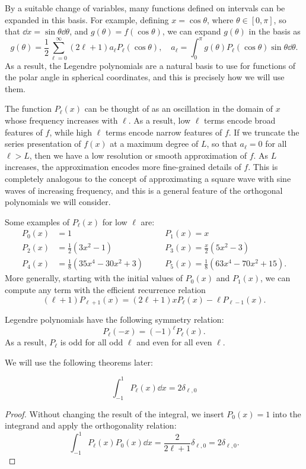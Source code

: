 \documentclass[../../main.tex]{subfiles}
\begin{document}
\begin{refsection}
	By a suitable change of variables, many functions defined on intervals can be expanded in this basis.
	For example, defining $x = \cos\theta$, where $\theta \in [0, \pi]$, so that $\dd{x} = \sin\theta \dd\theta$, and $g(\theta) = f(\cos\theta)$, we can expand $g(\theta)$ in the basis as
	$$g(\theta) = \frac{1}{2} \sum_{\ell=0}^\infty (2\ell+1) a_\ell P_\ell(\cos\theta), \quad a_\ell = \int_0^\pi g(\theta) P_\ell(\cos\theta) \sin\theta \dd{\theta}.$$
	As a result, the Legendre polynomials are a natural basis to use for functions of the polar angle in spherical coordinates, and this is precisely how we will use them.

	The function $P_\ell(x)$ can be thought of as an oscillation in the domain of $x$ whose frequency increases with $\ell$.
	As a result, low $\ell$ terms encode broad features of $f$, while high $\ell$ terms encode narrow features of $f$.
	If we truncate the series presentation of $f(x)$ at a maximum degree of $L$, so that $a_\ell = 0$ for all $\ell > L$, then we have a low resolution or smooth approximation of $f$.
	As $L$ increases, the approximation encodes more fine-grained details of $f$.
	This is completely analogous to the concept of approximating a square wave with sine waves of increasing frequency, and this is a general feature of the orthogonal polynomials we will consider.

	Some examples of $P_\ell(x)$ for low $\ell$ are:
	\begin{align*}
		P_0(x) & = 1 \quad                              &  & P_1(x) = x                                \\
		P_2(x) & = \frac{1}{2}(3x^2 - 1) \quad          &  & P_3(x) = \frac{x}{2}(5x^2 - 3)            \\
		P_4(x) & = \frac{1}{8}(35x^4 - 30x^2 + 3) \quad &  & P_5(x) = \frac{1}{8}(63x^4 - 70x^2 + 15).
	\end{align*}
	More generally, starting with the initial values of $P_0(x)$ and $P_1(x)$, we can compute any term with the efficient recurrence relation
	$$(\ell+1)P_{\ell+1}(x) = (2\ell+1)x P_\ell(x) - \ell P_{\ell-1}(x).$$

	Legendre polynomials have the following symmetry relation:
	$$P_\ell(-x) = (-1)^\ell P_\ell(x).$$
	As a result, $P_\ell$ is odd for all odd $\ell$ and even for all even $\ell$.

	We will use the following theorems later:
	\begin{theorem}\label{legendreisnorm}
		$$\int_{-1}^1 P_\ell(x) \dd{x} = 2 \delta_{\ell,0}$$
	\end{theorem}
	\begin{proof}
		Without changing the result of the integral, we insert $P_0(x) = 1$ into the integrand and apply the orthogonality relation:
		$$\int_{-1}^1 P_\ell(x) P_0(x) \dd{x} = \frac{2}{2\ell + 1} \delta_{\ell,0} = 2 \delta_{\ell,0}.$$
	\end{proof}


\end{refsection}
\end{document}
